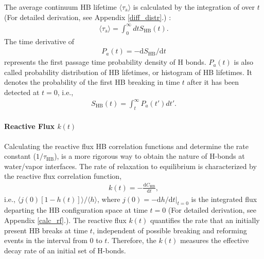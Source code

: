 The average continuum HB lifetime $\langle \tau_{\mathrm{a}} \rangle$ is calculated by the integration of \SHB over $t$ (For detailed derivation, see Appendix \ref{diff_distr}.) :  
\begin{eqnarray}
  \langle\tau_{\mathrm{a}}\rangle = \int_0^\infty dt S_{\text{HB}}(t).
\label{eq:calculate_hb_lifetime_from_s}
\end{eqnarray}
%
The time derivative of \SHB
\begin{eqnarray}
P_a(t) = -\text{d}S_{\text{HB}}/\text{d}t
\label{eq:P_1}
\end{eqnarray}
represents the first passage time probability density of H bonds. $P_a(t)$ is also called probability distribution of HB lifetimes, \cite{Sciortino1990prl,Krausche1992,FWS99,Voloshin2009} or histogram of HB lifetimes.\cite{Geiger1984,Stanley2000}
It denotes the probability of the first HB breaking in time $t$ after it has been detected at $t=0$, i.e.,
\begin{eqnarray}
S_{\text{HB}}(t)= \int_t^\infty P_a(t')dt'.
\label{eq:P_2}
\end{eqnarray}
%

\FloatBarrier
\paragraph{Reactive Flux $k(t)$} 
Calculating the reactive flux HB correlation functions and determine the rate constant ($1/\tau_{\text{HB}}$),
is a more rigorous way to obtain the nature of H-bonds at water/vapor interfaces. \cite{AL00}
The rate of relaxation to equilibrium is characterized by the reactive flux correlation function, 
\begin{eqnarray}
k(t) = -\frac{\text{d}C_{\text{HB}}}{\text{d}t},
\label{eq:k}
\end{eqnarray}
i.e., $\langle j(0)[1-h(t)]\rangle/\langle h\rangle$,
where 
$j(0)=-\text{d}h/\text{d}t|_{t=0}$ 
is the integrated flux departing the HB configuration space at time $t=0$ (For detailed derivation, see Appendix \ref{calc_rf}.).
The reactive flux $k(t)$ quantifies the rate that an initially present HB breaks at time $t$, 
independent of possible breaking and reforming events in the interval from 0 to $t$.
Therefore, the $k(t)$ measures the effective decay rate of an 
initial set of H-bonds. \cite{DC87,FWS00}

